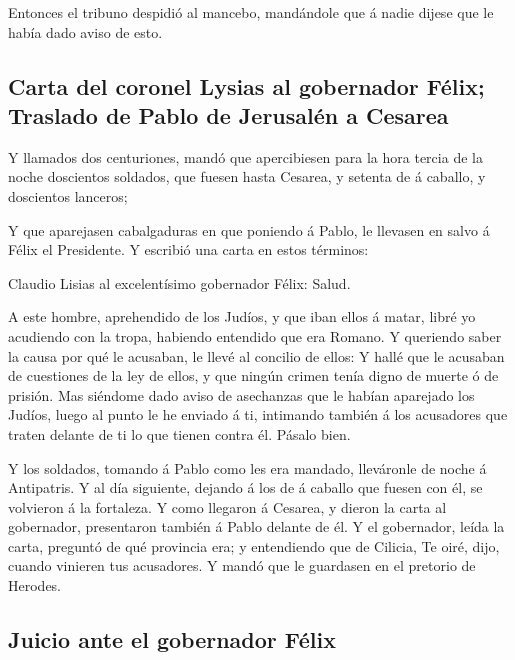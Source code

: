  Entonces el tribuno despidió al mancebo, mandándole que á
nadie dijese que le había dado aviso de esto.

\hypertarget{carta-del-coronel-lysias-al-gobernador-fuxe9lix-traslado-de-pablo-de-jerusaluxe9n-a-cesarea}{%
\subsection{Carta del coronel Lysias al gobernador Félix; Traslado de
Pablo de Jerusalén a
Cesarea}\label{carta-del-coronel-lysias-al-gobernador-fuxe9lix-traslado-de-pablo-de-jerusaluxe9n-a-cesarea}}

 Y llamados dos centuriones, mandó que apercibiesen para la
hora tercia de la noche doscientos soldados, que fuesen hasta Cesarea, y
setenta de á caballo, y doscientos lanceros;

 Y que aparejasen cabalgaduras en que poniendo á Pablo, le
llevasen en salvo á Félix el Presidente.  Y escribió una
carta en estos términos:

 Claudio Lisias al excelentísimo gobernador Félix: Salud.

 A este hombre, aprehendido de los Judíos, y que iban ellos
á matar, libré yo acudiendo con la tropa, habiendo entendido que era
Romano.  Y queriendo saber la causa por qué le acusaban, le
llevé al concilio de ellos:  Y hallé que le acusaban de
cuestiones de la ley de ellos, y que ningún crimen tenía digno de muerte
ó de prisión.  Mas siéndome dado aviso de asechanzas que le
habían aparejado los Judíos, luego al punto le he enviado á ti,
intimando también á los acusadores que traten delante de ti lo que
tienen contra él. Pásalo bien.

 Y los soldados, tomando á Pablo como les era mandado,
lleváronle de noche á Antipatris.  Y al día siguiente,
dejando á los de á caballo que fuesen con él, se volvieron á la
fortaleza.  Y como llegaron á Cesarea, y dieron la carta al
gobernador, presentaron también á Pablo delante de él.  Y
el gobernador, leída la carta, preguntó de qué provincia era; y
entendiendo que de Cilicia,  Te oiré, dijo, cuando vinieren
tus acusadores. Y mandó que le guardasen en el pretorio de Herodes.

\hypertarget{juicio-ante-el-gobernador-fuxe9lix}{%
\subsection{Juicio ante el gobernador
Félix}\label{juicio-ante-el-gobernador-fuxe9lix}}

